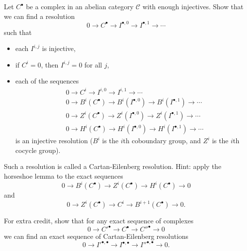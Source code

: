 \begin{exer} Let $C^\bullet$ be a complex in an abelian category $\mathcal{C}$ with enough injectives. Show that we can find a resolution
\[
0 \rightarrow C^\bullet \rightarrow I^{\bullet,0} \rightarrow I^{\bullet,1} \rightarrow \cdots
\]
such that
\begin{itemize}
\item each $I^{i,j}$ is injective,

\item if $C^i = 0$, then $I^{i,j} = 0$ for all $j$,

\item each of the sequences
\begin{align*}
&0 \rightarrow C^i \rightarrow I^{i,0} \rightarrow I^{i,1} \rightarrow \cdots\\
&0 \rightarrow B^i(C^\bullet) \rightarrow B^i(I^{\bullet,0}) \rightarrow B^i(I^{\bullet,1}) \rightarrow \cdots\\
&0 \rightarrow Z^i(C^\bullet) \rightarrow Z^i(I^{\bullet,0}) \rightarrow Z^i(I^{\bullet,1}) \rightarrow \cdots\\
&0 \rightarrow H^i(C^\bullet) \rightarrow H^i(I^{\bullet,0}) \rightarrow H^i(I^{\bullet,1}) \rightarrow \cdots
\end{align*}
is an injective resolution ($B^i$ is the $i$th coboundary group, and $Z^i$ is the $i$th cocycle group).
\end{itemize}
Such a resolution is called a Cartan-Eilenberg resolution. Hint: apply the horseshoe lemma to the exact sequences
\[
0 \rightarrow B^i(C^\bullet) \rightarrow Z^i(C^\bullet) \rightarrow H^i(C^\bullet) \rightarrow 0
\]
and
\[
0 \rightarrow Z^i(C^\bullet) \rightarrow C^i \rightarrow B^{i+1}(C^\bullet) \rightarrow 0.
\]
\end{exer}

\begin{exer} For extra credit, show that for any exact sequence of complexes
\[
0 \rightarrow C'^\bullet \rightarrow C^\bullet \rightarrow C''^\bullet \rightarrow 0
\]
we can find an exact sequence of Cartan-Eilenberg resolutions
\[
0 \rightarrow I'^{\bullet,\bullet} \rightarrow I^{\bullet,\bullet} \rightarrow I''^{\bullet,\bullet} \rightarrow 0.
\]
\end{exer}

